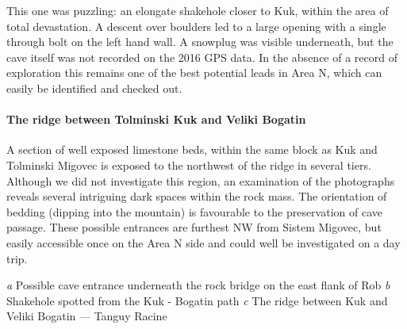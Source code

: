 This one was puzzling: an elongate shakehole closer to Kuk, within the area of total devastation. A descent over boulders led to a large opening with a single through bolt on the left hand wall. A snowplug was visible underneath, but the cave itself was not recorded on the 2016 GPS data. In the absence of a record of exploration this remains one of the best potential leads in Area N, which can easily be identified and checked out.

\paragraph{The ridge between Tolminski Kuk and Veliki Bogatin}

A section of well exposed limestone beds, within the same block as Kuk and Tolminski Migovec is exposed to the northwest of the ridge in several tiers. Although we did not investigate this region, an examination of the photographs reveals several intriguing dark spaces within the rock mass. The orientation of bedding (dipping into the mountain) is favourable to the preservation of cave passage.  These possible entrances are furthest NW from Sistem Migovec, but easily accessible once on the Area N side and could well be investigated on a day trip.

\begin{pagefigure}
\checkoddpage \ifoddpage \forcerectofloat \else \forceversofloat \fi
\centering
    \begin{subfigure}[t]{0.454\textwidth}
        \centering
        
        \caption{} \label{rockbridge}
    \end{subfigure}
        \hfill
\begin{subfigure}[t]{0.536\textwidth}
\centering
{} 
 \caption{}\label{shakehole next to kuk}
\end{subfigure}
    \vspace{0cm}
    \begin{subfigure}[t]{\textwidth}
    \centering
       
        \caption{} \label{ridge west}
    \end{subfigure}
    \caption{
    \emph{a} Possible cave entrance underneath the rock bridge on the east flank of Rob  
     \emph{b} Shakehole spotted from the Kuk - Bogatin path
     \emph{c} The ridge between Kuk and Veliki Bogatin --- Tanguy Racine }
\end{pagefigure}


